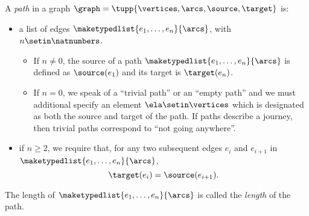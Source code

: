 \begin{ctdefinition}[Paths]
    \label{def:path}
    A \emph{path} in a graph $\graph=\tupp{\vertices,\arcs, \source,\target}$ is:

    \constit

    \begin{itemize}
        \item a list of edges $\maketypedlist{e_1, \dots, e_n}{\arcs}$, with $n \setin \natnumbers$.
              \begin{itemize}
                  \item If $n \neq 0$, the source of a path $\maketypedlist{e_1, \dots, e_n}{\arcs}$ is defined as $\source(e_1)$ and its target is $\target(e_n)$.
                  \item If $n = 0$, we speak of a ``trivial path'' or an ``empty path'' and we must additional specify an element $\ela \setin \vertices$ which is designated as both the source and target of the path.
                        If paths describe a journey, then trivial paths correspond to ``not going anywhere''.
              \end{itemize}
    \end{itemize}

    \condit

    \begin{itemize}
        \item if $n \geq 2$, we require that, for any two subsequent edges $e_i$ and $e_{i+1}$ in $\maketypedlist{e_1, \dots, e_n}{\arcs}$,
              \begin{equation}
                  \target(e_i) = \source(e_{i+1}).
              \end{equation}
    \end{itemize}
    The length of $\maketypedlist{e_1, \dots, e_n}{\arcs}$ is called the \emph{length} of the path.
\end{ctdefinition}
